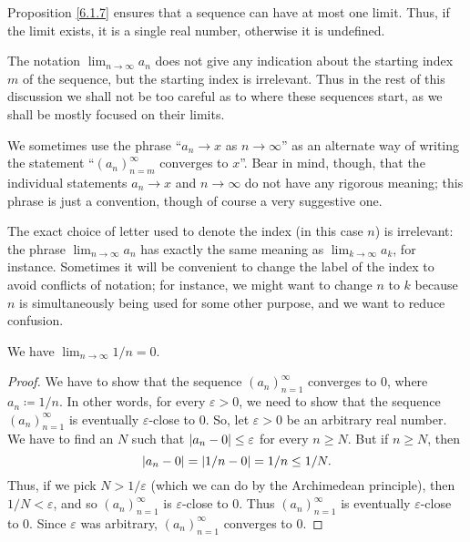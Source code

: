 \begin{note}
Proposition \ref{6.1.7} ensures that a sequence can have at most one limit.
Thus, if the limit exists, it is a single real number, otherwise it is undefined.
\end{note}

\begin{remark}\label{6.1.9}
The notation \(\lim_{n \to \infty} a_n\) does not give any indication about the starting index \(m\) of the sequence, but the starting index is irrelevant.
Thus in the rest of this discussion we shall not be too careful as to where these sequences start, as we shall be mostly focused on their limits.
\end{remark}

\begin{note}
We sometimes use the phrase ``\(a_n \to x\) as \(n \to \infty\)'' as an alternate way of writing the statement ``\((a_n)_{n = m}^\infty\) converges to \(x\)''.
Bear in mind, though, that the individual statements \(a_n \to x\) and \(n \to \infty\) do not have any rigorous meaning;
this phrase is just a convention, though of course a very suggestive one.
\end{note}

\begin{remark}\label{6.1.10}
The exact choice of letter used to denote the index (in this case \(n\)) is irrelevant:
the phrase \(\lim_{n \to \infty} a_n\) has exactly the same meaning as \(\lim_{k \to \infty} a_k\), for instance.
Sometimes it will be convenient to change the label of the index to avoid conflicts of notation;
for instance, we might want to change \(n\) to \(k\) because \(n\) is simultaneously being used for some other purpose, and we want to reduce confusion.
\end{remark}

\begin{proposition}\label{6.1.11}
We have \(\lim_{n \to \infty} 1 / n = 0\).
\end{proposition}

\begin{proof}
We have to show that the sequence \((a_n)_{n = 1}^\infty\) converges to \(0\), where \(a_n \coloneqq 1 / n\).
In other words, for every \(\varepsilon > 0\), we need to show that the sequence \((a_n)_{n = 1}^\infty\) is eventually \(\varepsilon\)-close to \(0\).
So, let \(\varepsilon > 0\) be an arbitrary real number.
We have to find an \(N\) such that \(\abs*{a_n - 0} \leq \varepsilon\) for every \(n \geq N\).
But if \(n \geq N\), then
\[
    \abs*{a_n - 0} = \abs*{1 / n - 0} = 1 / n \leq 1 / N.
\]
Thus, if we pick \(N > 1 / \varepsilon\) (which we can do by the Archimedean principle), then \(1 / N < \varepsilon\), and so \((a_n)_{n = 1}^\infty\) is \(\varepsilon\)-close to \(0\).
Thus \((a_n)_{n = 1}^\infty\) is eventually \(\varepsilon\)-close to \(0\).
Since \(\varepsilon\) was arbitrary, \((a_n)_{n = 1}^\infty\) converges to \(0\).
\end{proof}

